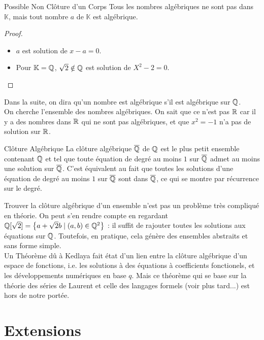 \documentclass{cours}
\renewcommand*{\K}{\mathbb{K}}
\begin{document}
    \begin{propositionfr}{Possible Non Clôture d'un Corps}{}
        Tous les nombres algébriques ne sont pas dans $\K$, mais tout nombre $a$ de $\K$ est algébrique.
    \end{propositionfr}
    \begin{proof}
        \begin{itemize}
            \item $a$ est solution de $x - a = 0$. 
            \item Pour $\K = \Q$, $\sqrt{2} \notin \mathbb{Q}$ est solution de $X^{2} - 2 = 0$. 
        \end{itemize}
    \end{proof}
    
    Dans la suite, on dira qu'un nombre est algébrique s'il est algébrique sur $\mathbb{Q}$.\\
    On cherche l'ensemble des nombres algébriques. On sait que ce n'est pas $\mathbb{R}$ car il y a des nombres dans $\mathbb{R}$ qui ne sont pas algébriques, et que $x^{2} = -1$ n'a pas de solution sur $\mathbb{R}$.

    \begin{définition}{Clôture Algébrique}{}
        La clôture algébrique $\overline{\mathbb{Q}}$ de $\mathbb{Q}$ est le plus petit ensemble contenant $\mathbb{Q}$ et tel que toute équation de degré au moins $1$ sur $\overline{\mathbb{Q}}$ admet au moins une solution sur $\overline{\mathbb{Q}}$. C'est équivalent au fait que toutes les solutions d'une équation de degré au moins $1$ sur $\overline{\mathbb{Q}}$ sont dans $\overline{\mathbb{Q}}$, ce qui se montre par récurrence sur le degré.
    \end{définition}

    Trouver la clôture algébrique d'un ensemble n'est pas un problème très compliqué en théorie.  On peut s'en rendre compte en regardant $\mathbb{Q}[\sqrt{2}] = \left\{a + \sqrt{2}b \mid (a, b) \in \mathbb{Q}^{2}\right\}$ : il suffit de rajouter toutes les solutions aux équations sur $\mathbb{Q}$. Toutefois, en pratique, cela génère des ensembles abstraits et sans forme simple.\\

    Un Théorème dû à Kedlaya fait état d'un lien entre la clôture algébrique d'un espace de fonctions, i.e. les solutions à des équations à coefficients fonctionels, et les développements numériques en base $q$. Mais ce théorème qui se base sur la théorie des séries de Laurent et celle des langages formels (voir plus tard...) est hors de notre portée.

    \section{Extensions}
\end{document}
